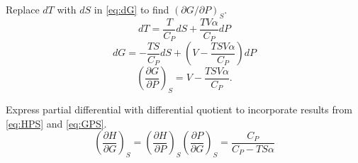 \begin{@empty}
\begin{answer}
    Replace $dT$ with $dS$ in \eqref{eq:dG} to find
    $\left( \partial G / \partial P \right)_S$.
    \[ dT = \frac{T}{C_P} dS + \frac{TV\alpha}{C_P} dP \]
    \[ dG = -\frac{TS}{C_P} dS + \left( V - \frac{TSV\alpha}{C_P} \right) dP \]
    \begin{equation}
        \left( \frac{\partial G}{\partial P} \right)_S = V - \frac{TSV\alpha}{C_P}. \label{eq:GPS}
    \end{equation}

    Express partial differential with differential quotient to incorporate
    results from \eqref{eq:HPS} and \eqref{eq:GPS}.
    \[
        \left( \frac{\partial H}{\partial G} \right)_S
        = \left( \frac{\partial H}{\partial P} \right)_S \left( \frac{\partial P}{\partial G} \right)_S
        = \frac{C_P}{C_P - TS\alpha}
    \]
\end{answer}
\end{@empty}

